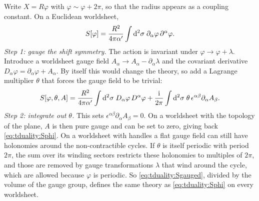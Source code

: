 Write $X=R\varphi$ with $\varphi\sim\varphi+2\pi$, so that the radius appears as a coupling
constant. On a Euclidean worldsheet,
\begin{equation}\label{eq:tduality:Sphi}
  S[\varphi]=\frac{R^2}{4\pi\alpha'}\int\mathrm{d}^2\sigma\;\partial_\alpha\varphi\,\partial^\alpha\varphi .
\end{equation}
\emph{Step 1: gauge the shift symmetry.} The action is invariant under
$\varphi\to\varphi+\lambda$. Introduce a worldsheet gauge field $A_\alpha\to A_\alpha-\partial_\alpha\lambda$
and the covariant derivative $D_\alpha\varphi=\partial_\alpha\varphi+A_\alpha$. By itself this
would change the theory, so add a Lagrange multiplier $\theta$ that forces the gauge field to
be trivial:
\begin{equation}\label{eq:tduality:Sgauged}
  S[\varphi,\theta,A]=\frac{R^2}{4\pi\alpha'}\int\mathrm{d}^2\sigma\;D_\alpha\varphi\,D^\alpha\varphi
    +\frac{\mathrm{i}}{2\pi}\int\mathrm{d}^2\sigma\;\theta\,\epsilon^{\alpha\beta}\partial_\alpha A_\beta .
\end{equation}
\emph{Step 2: integrate out $\theta$.} This sets $\epsilon^{\alpha\beta}\partial_\alpha A_\beta=0$.
On a worldsheet with the topology of the plane, $A$ is then pure gauge and can be set to
zero, giving back \eqref{eq:tduality:Sphi}. On a worldsheet with handles a flat gauge field
can still have holonomies around the non-contractible cycles. If $\theta$ is itself periodic
with period $2\pi$, the sum over its winding sectors restricts these holonomies to multiples
of $2\pi$, and those are removed by gauge transformations $\lambda$ that wind around the cycle,
which are allowed because $\varphi$ is periodic. So \eqref{eq:tduality:Sgauged}, divided
by the volume of the gauge group, defines the same theory as \eqref{eq:tduality:Sphi} on every
worldsheet.

